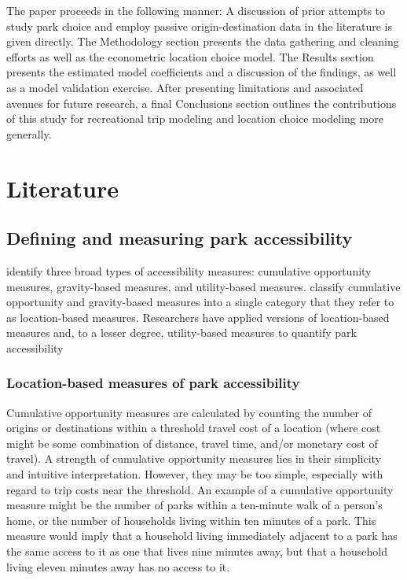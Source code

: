 \documentclass[3p, authoryear]{elsarticle} %
\begin{document}
The paper proceeds in the following manner: A discussion of prior attempts to
study park choice and employ passive origin-destination data in the literature
is given directly. The Methodology section presents the data gathering and
cleaning efforts as well as the econometric location choice model. The Results
section presents the estimated model coefficients and a discussion of the
findings, as well as a model validation exercise. After presenting limitations
and associated avenues for future research, a final Conclusions section
outlines the contributions of this study for recreational trip modeling and
location choice modeling more generally.

\hypertarget{literature}{%
\section{Literature}\label{literature}}

\hypertarget{defining-and-measuring-park-accessibility}{%
\subsection{Defining and measuring park accessibility}\label{defining-and-measuring-park-accessibility}}

\citet{Handy1997} identify three broad types of accessibility measures: cumulative
opportunity measures, gravity-based measures, and utility-based measures.
\citet{GEURS2004127} classify cumulative opportunity and gravity-based measures into
a single category that they refer to as location-based measures. Researchers
have applied versions of location-based measures and, to a lesser degree,
utility-based measures to quantify park accessibility

\hypertarget{location-based-measures-of-park-accessibility}{%
\subsubsection{Location-based measures of park accessibility}\label{location-based-measures-of-park-accessibility}}

Cumulative opportunity measures are calculated by counting the number of origins
or destinations within a threshold travel cost of a location (where cost might
be some combination of distance, travel time, and/or monetary cost of travel). A
strength of cumulative opportunity measures lies in their simplicity and
intuitive interpretation. However, they may be too simple, especially with
regard to trip costs near the threshold. An example of a cumulative opportunity
measure might be the number of parks within a ten-minute walk of a person's
home, or the number of households living within ten minutes of a park. This
measure would imply that a household living immediately adjacent to a park has
the same access to it as one that lives nine minutes away, but that a household
living eleven minutes away has no access to it.
\end{document}
